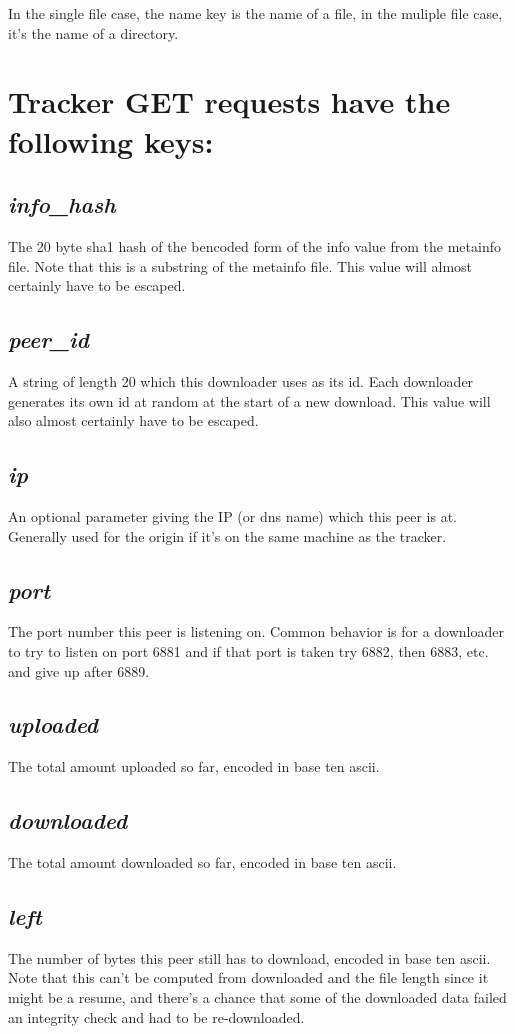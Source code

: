 \documentclass{article}
\begin{document}
    In the single file case, the name key is the name of a file, in the muliple file case, it's the name of a directory.


{\section{Tracker GET requests have the following keys:}}
{\subsection{\it info\_hash}}
The 20 byte sha1 hash of the bencoded form of the info value from the metainfo file. Note that this is a substring of the metainfo file. This value will almost certainly have to be escaped.

{\subsection{\it peer\_id}}
A string of length 20 which this downloader uses as its id. Each downloader generates its own id at random at the start of a new download. This value will also almost certainly have to be escaped.

{\subsection{\it ip}}
An optional parameter giving the IP (or dns name) which this peer is at. Generally used for the origin if it's on the same machine as the tracker.

{\subsection{\it port}}
The port number this peer is listening on. Common behavior is for a downloader to try to listen on port 6881 and if that port is taken try 6882, then 6883, etc. and give up after 6889.

{\subsection{\it uploaded}}
The total amount uploaded so far, encoded in base ten ascii.

{\subsection{\it downloaded}}
The total amount downloaded so far, encoded in base ten ascii.

{\subsection{\it left}}
The number of bytes this peer still has to download, encoded in base ten ascii. Note that this can't be computed from downloaded and the file length since it might be a resume, and there's a chance that some of the downloaded data failed an integrity check and had to be re-downloaded.
\end{document}
